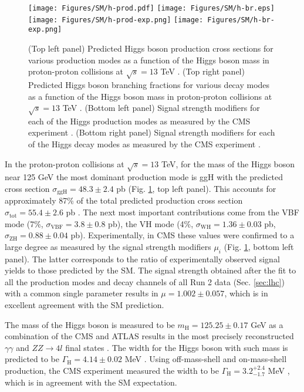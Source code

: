 \begin{figure}[!ht]
    \centering
    \texttt{[image: Figures/SM/h-prod.pdf]}
    \texttt{[image: Figures/SM/h-br.eps]}
    \texttt{[image: Figures/SM/h-prod-exp.png]}
    \texttt{[image: Figures/SM/h-br-exp.png]}
    \caption{(Top left panel) Predicted Higgs boson production cross sections for various production modes as a function of the Higgs boson mass in proton-proton collisions at $\sqrt{s} = 13$ TeV \cite{LHCHiggsCrossSectionWorkingGroup:2016ypw}. (Top right panel) Predicted Higgs boson branching fractions for various decay modes as a function of the Higgs boson mass in proton-proton collisions at $\sqrt{s} = 13$ TeV \cite{LHCHiggsCrossSectionWorkingGroup:2013rie}. (Bottom left panel) Signal strength modifiers for each of the Higgs production modes as measured by the CMS experiment \cite{CMS:2022dwd}. (Bottom right panel) Signal strength modifiers for each of the Higgs decay modes as measured by the CMS experiment \cite{CMS:2022dwd}.}
    \label{fig:h-prod}
\end{figure}

In the proton-proton collisions at $\sqrt{s}=13$ TeV, for the mass of the Higgs boson near 125 GeV the most dominant production mode is ggH with the predicted cross section $\sigma_\text{ggH} = 48.3 \pm 2.4$ pb (Fig. \ref{fig:h-prod}, top left panel). This accounts for approximately 87\% of the total predicted production cross section $\sigma_\text{tot} = 55.4 \pm 2.6$ pb \cite{LHCHiggsCrossSectionWorkingGroup:2016ypw}. The next most important contributions come from the VBF mode (7\%, $\sigma_\text{VBF} = 3.8 \pm 0.8$ pb), the VH mode (4\%, $\sigma_\text{WH} = 1.36 \pm 0.03$ pb, $\sigma_\text{ZH} = 0.88 \pm 0.04$ pb). Experimentally, in CMS these values were confirmed to a large degree as measured by the signal strength modifiers $\mu_i$ (Fig. \ref{fig:h-prod}, bottom left panel). The latter corresponds to the ratio of experimentally observed signal yields to those predicted by the SM. The signal strength obtained after the fit to all the production modes and decay channels  of all Run 2 data (Sec. \ref{sec:lhc}) with a common single parameter results in $\mu = 1.002 \pm 0.057$, which is in excellent agreement with the SM prediction.

The mass of the Higgs boson is measured to be $m_\text{H} = 125.25 \pm 0.17$ GeV as a combination of the CMS and ATLAS results in the most precisely reconstructed $\gamma\gamma$ and $ZZ \to 4l$ final states \cite{ParticleDataGroup:2020ssz}. The width for the Higgs boson with such mass is predicted to be $\Gamma_\text{H} = 4.14 \pm 0.02$ MeV \cite{LHCHiggsCrossSectionWorkingGroup:2016ypw}. Using off-mass-shell and on-mass-shell production, the CMS experiment measured the width to be $\Gamma_\text{H} = 3.2^{+2.4}_{-1.7}$ MeV \cite{CMS:2022ley}, which is in agreement with the SM expectation. 

